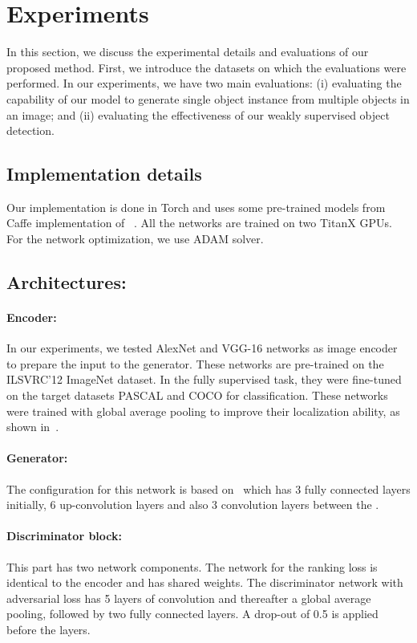\documentclass[runningheads]{llncs}
\begin{document}
\section{Experiments}\label{sec:exp}

In this section, we discuss the experimental details and evaluations of our proposed method. First, we introduce the datasets on which the evaluations were performed. In our experiments, we have two main evaluations: (i) evaluating the capability of our model to generate single object instance from multiple objects in an image; and (ii) evaluating the effectiveness of our weakly supervised object detection.

\subsection{Implementation details}
Our implementation is done in Torch and uses some pre-trained models from Caffe implementation of ~\cite{dosovitskiy2}. All the networks are trained on two TitanX GPUs. For the network optimization, we use ADAM solver.

\subsection*{Architectures:}
\paragraph*{Encoder:} In our experiments, we tested AlexNet and VGG-16 networks as image encoder to prepare the input to the generator. These networks are pre-trained on the ILSVRC'12 ImageNet dataset. In the fully supervised task, they were fine-tuned on the target datasets PASCAL and COCO for classification. These networks were trained with global average pooling to improve their localization ability, as shown in~\cite{diba,gap}.

\paragraph*{Generator:} The configuration for this network is based on~\cite{dosovitskiy2} which has 3 fully connected layers initially, 6 up-convolution layers and also 3 convolution layers between the .

\paragraph*{Discriminator block:} This part has two network components. The network for the ranking loss is identical to the encoder and has shared weights. The discriminator network with adversarial loss has 5 layers of convolution and thereafter a global average pooling, followed by two fully connected layers. A drop-out of 0.5 is applied before the  layers.
\end{document}
